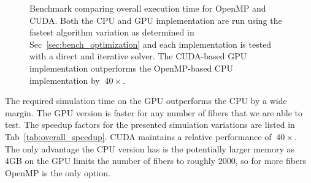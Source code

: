 \begin{figure}[!htbp]
  \centering
  \caption[Benchmark overall execution time.]{Benchmark comparing overall execution time for OpenMP and CUDA. Both the CPU and GPU implementation are run using the fastest algorithm variation as determined in Sec~\ref{sec:bench_optimization} and each implementation is tested with a direct and iterative solver. The CUDA-based GPU implementation outperforms the OpenMP-based CPU implementation by $~40×$.}
  \label{fig:overall}
\end{figure}

The required simulation time on the GPU outperforms the CPU by a wide margin. The GPU version is faster for any number of fibers that we are able to test. The speedup factors for the presented simulation variations are listed in Tab~\ref{tab:overall_speedup}. CUDA maintains a relative performance of $~40×$. The only advantage the CPU version has is the potentially larger memory as 4GB on the GPU limits the number of fibers to roughly $2000$, so for more fibers OpenMP is the only option.

